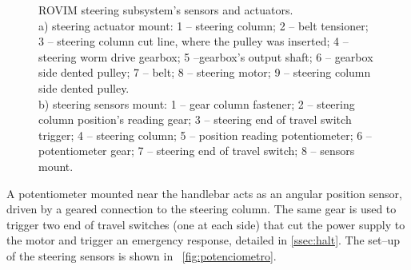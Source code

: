 \documentclass[journal]{IEEEtran}
\begin{document}
\begin{figure}[!t]%
    \centering
        \hfill
        \caption[]{ROVIM steering subsystem's sensors and actuators.\\\hspace{\textwidth}a) steering actuator mount: 1 -- steering column; 2 -- belt tensioner; 3 -- steering column cut line, where the pulley was inserted; 4 -- steering worm drive gearbox; 5 --gearbox's output shaft; 6 -- gearbox side dented pulley; 7 -- belt; 8 -- steering motor; 9 -- steering column side dented pulley.\\\hspace{\textwidth}b) steering sensors mount: 1 -- gear column fastener; 2 -- steering column position's reading gear; 3 -- steering end of travel switch trigger; 4 -- steering column; 5 -- position reading potentiometer; 6 -- potentiometer gear; 7 -- steering end of travel switch; 8 -- sensors mount.}
\end{figure}

A potentiometer mounted near the handlebar acts as an angular position sensor, driven by a geared connection to the steering column. The same gear is used to trigger two end of travel switches (one at each side) that cut the power supply to the motor and trigger an emergency response, detailed in \ref{ssec:halt}. The set--up of the steering sensors is shown in \figurename~\ref{fig:potenciometro}.
\end{document}
